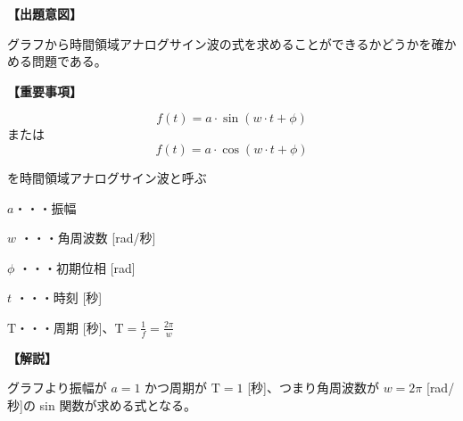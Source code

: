 \noindent \textbf{【出題意図】}

\noindent グラフから時間領域アナログサイン波の式を求めることができるかどうかを確かめる問題である。

\vspace{1em}
\noindent \textbf{【重要事項】}

\[
f(t) = a \cdot \sin( w \cdot t + \phi )
\]
%
\noindent または
%
\[
f(t) = a \cdot \cos( w \cdot t + \phi )
\]

\medskip
\noindent を時間領域アナログサイン波と呼ぶ

\bigskip
\noindent $a$・・・振幅

\bigskip
\noindent $w$ ・・・角周波数 [rad/秒]

\bigskip
\noindent $\phi$ ・・・初期位相 [rad]

\bigskip
\noindent $t$ ・・・時刻 [秒]

\bigskip
$\textrm{T}$・・・周期 [秒]、$\textrm{T} = \frac{1}{f} = \frac{2\pi}{w}$

\vspace{1em}
\noindent \textbf{【解説】}

\noindent グラフより振幅が $a = 1$ かつ周期が $\textrm{T} = 1$ [秒]、つまり角周波数が $w = 2\pi$ [rad/秒]の sin 関数が求める式となる。
